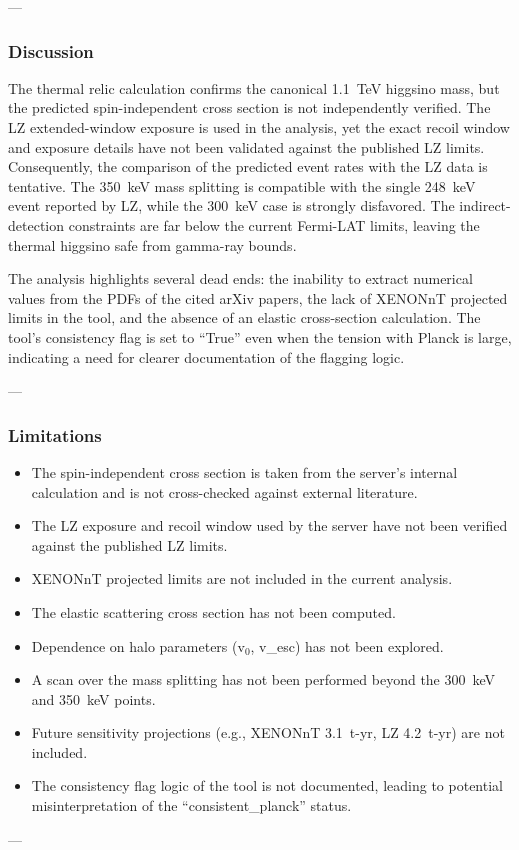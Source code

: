 \documentclass[11pt,a4paper]{article}
\begin{document}
---

\subsubsection*{Discussion}
The thermal relic calculation confirms the canonical 1.1~TeV higgsino mass, but the predicted spin-independent cross section is not independently verified.  The LZ extended-window exposure is used in the analysis, yet the exact recoil window and exposure details have not been validated against the published LZ limits.  Consequently, the comparison of the predicted event rates with the LZ data is tentative.  The 350~keV mass splitting is compatible with the single 248~keV event reported by LZ, while the 300~keV case is strongly disfavored.  The indirect-detection constraints are far below the current Fermi-LAT limits, leaving the thermal higgsino safe from gamma-ray bounds.

The analysis highlights several dead ends: the inability to extract numerical values from the PDFs of the cited arXiv papers, the lack of XENONnT projected limits in the tool, and the absence of an elastic cross-section calculation.  The tool's consistency flag is set to ``True'' even when the tension with Planck is large, indicating a need for clearer documentation of the flagging logic.

---

\subsubsection*{Limitations}
\begin{itemize}
  \item The spin-independent cross section is taken from the server's internal calculation and is not cross-checked against external literature.
  \item The LZ exposure and recoil window used by the server have not been verified against the published LZ limits.
  \item XENONnT projected limits are not included in the current analysis.
  \item The elastic scattering cross section has not been computed.
  \item Dependence on halo parameters (v$_0$, v\_esc) has not been explored.
  \item A scan over the mass splitting has not been performed beyond the 300~keV and 350~keV points.
  \item Future sensitivity projections (e.g., XENONnT 3.1~t-yr, LZ 4.2~t-yr) are not included.
  \item The consistency flag logic of the tool is not documented, leading to potential misinterpretation of the ``consistent\_planck'' status.
\end{itemize}
---
\end{document}
